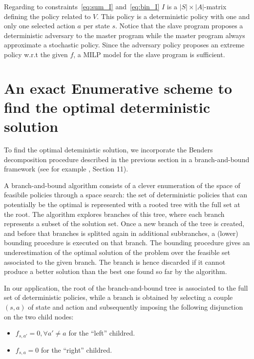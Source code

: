 \documentclass[runningheads,a4paper]{llncs}
\begin{document}
Regarding to constraints~\eqref{eq:sum_I} and~\eqref{eq:bin_I} $I$ is a $|S|\times|A|$-matrix defining the policy related to $V$. This policy is a deterministic policy with one and only one selected action $a$ per state $s$. Notice that the slave program proposes a deterministic adversary to the master program while the master program always approximate a stochastic policy. Since the adversary policy proposes an extreme policy w.r.t the given $f$, a MILP model for the slave program is sufficient.   


\section{An exact Enumerative scheme to find the optimal deterministic solution} 

To find the optimal deteministic solution,  we incorporate the Benders decomposition procedure described in the previous section in a branch-and-bound framework (see for example \cite{bertsimas2005optimization}, Section 11). 

A branch-and-bound algorithm consists of a clever enumeration of the space of feasibile policies through a space search: the set of deterministic policies that can potentially be the optimal is represented with a rooted tree with the full set at the root. The algorithm explores branches of this tree, where each branch represents a subset of the solution set.
Once a new branch of the tree is created, and before that branches is splitted again in additional subbranches, a (lower) bounding procedure is executed on that branch. The bounding procedure gives an underestimation of the optimal solution of the problem over the feasible set associated to the given branch.
The branch is hence discarded if it cannot produce a better solution than the best one found so far by the algorithm.

In our application, the root of the branch-and-bound tree is associated to the full set of deterministic policies, while a branch is obtained by selecting a couple $(s,a)$ of state and action and subsequently imposing the following disjunction on the two child nodes:
\begin{itemize}
\item $f_{s,a'}=0, \forall a'\neq a$ for the ``left'' childred.
\item $f_{s,a}=0$ for the ``right'' childred. 
\end{itemize} 
\end{document}
